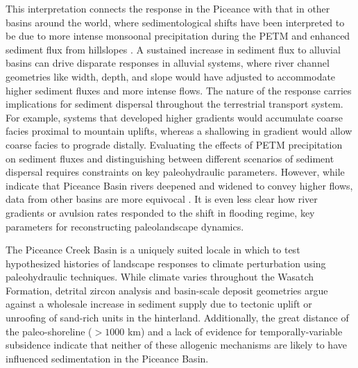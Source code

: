 \documentclass[draft]{compact_proposal}\usepackage[]{graphicx}\usepackage[]{color}
\begin{document}
This interpretation connects the response in the Piceance with that in other basins around the world, where sedimentological shifts have been interpreted to be due to more intense monsoonal precipitation during the PETM and enhanced sediment flux from hillslopes .
A sustained increase in sediment flux to alluvial basins can drive disparate responses in alluvial systems, where river channel geometries like width, depth, and slope would have adjusted to accommodate higher sediment fluxes and more intense flows.
The nature of the response carries implications for sediment dispersal throughout the terrestrial transport system.
For example, systems that developed higher gradients would accumulate coarse facies proximal to mountain uplifts, whereas a shallowing in gradient would allow coarse facies to prograde distally.
Evaluating the effects of PETM precipitation on sediment fluxes and distinguishing between different scenarios of sediment dispersal requires constraints on key paleohydraulic parameters.
However, while \textcite{foreman_fluvial_2012} indicate that Piceance Basin rivers deepened and widened to convey higher flows, data from other basins are more equivocal \parencite{chen_estimating_2018}. 
It is even less clear how river gradients or avulsion rates responded to the shift in flooding regime, key parameters for reconstructing paleolandscape dynamics.

The Piceance Creek Basin is a uniquely suited locale in which to test hypothesized histories of landscape responses to climate perturbation using paleohydraulic techniques. 
While climate varies throughout the Wasatch Formation, detrital zircon analysis and basin-scale deposit geometries argue against a wholesale increase in sediment supply due to tectonic uplift or unroofing of sand-rich units in the hinterland.
Additionally, the great distance of the paleo-shoreline ($>1000$ km) and a lack of evidence for temporally-variable subsidence indicate that neither of these allogenic mechanisms are likely to have influenced sedimentation in the Piceance Basin.
\end{document}
